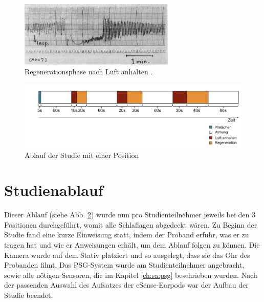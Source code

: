 \begin{figure}[ht]
    \centering
    \includegraphics[width=0.66\textwidth]{images/respiration/respiration_regeneration}
    \caption{Regenerationsphase nach Luft anhalten \cite{beath_rebreathing}.}
    \label{fig_respiration_regeneration}
\end{figure}

\begin{figure}[ht]
    \centering
    \includegraphics[width=1\textwidth]{images/study/study_flow2}
    \caption{Ablauf der Studie mit einer Position}
    \label{fig_study_flow}
\end{figure}

\section{Studienablauf}
Dieser Ablauf (siehe Abb. \ref{fig_study_flow}) wurde nun pro Studienteilnehmer jeweils bei den 3 Positionen durchgeführt, womit alle Schlaflagen abgedeckt wären.
Zu Beginn der Studie fand eine kurze Einweisung statt, indem der Proband erfuhr, was er zu tragen hat und wie er Anweisungen erhält, um dem Ablauf folgen zu können. 
Die Kamera wurde auf dem Stativ platziert und so ausgelegt, dass sie das Ohr des Probanden filmt. 
Das PSG-System wurde am Studienteilnehmer angebracht, sowie alle nötigen Sensoren, die im Kapitel \ref{ch:sa:psg} beschrieben wurden.
Nach der passenden Auswahl des Aufsatzes der eSense-Earpods war der Aufbau der Studie beendet.

